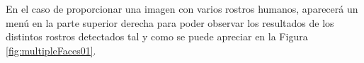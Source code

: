 \documentclass[a4paper,11pt]{book}
\begin{document}
En el caso de proporcionar una imagen con varios rostros humanos, aparecerá un menú en la parte superior derecha para poder observar los resultados de los distintos rostros detectados tal y como se puede apreciar en la Figura \ref{fig:multipleFaces01}.





%
%
%
%
%
%
%
%
%
%
%
%
%
%
%
%
%
%
%
%
%
\chapter*{}
\thispagestyle{empty}
\end{document}
